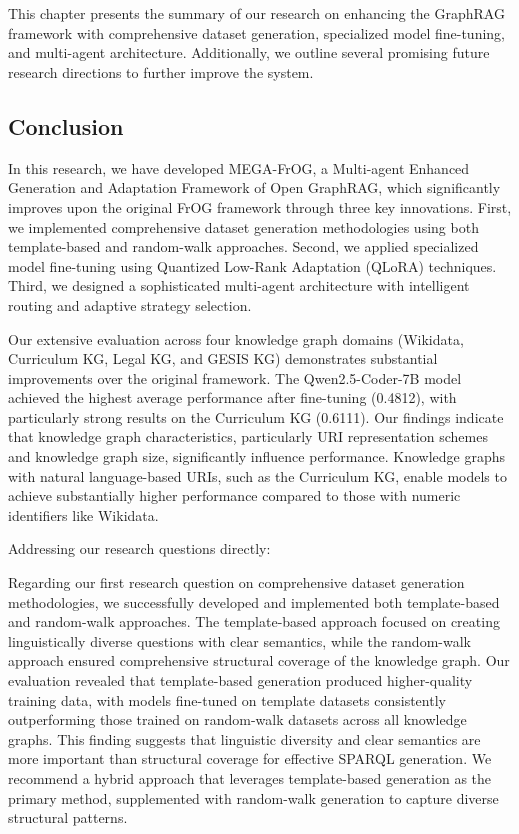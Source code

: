 \chapter{\kesimpulan}
\label{bab:6}
This chapter presents the summary of our research on enhancing the GraphRAG framework with comprehensive dataset generation, specialized model fine-tuning, and multi-agent architecture. Additionally, we outline several promising future research directions to further improve the system.

\section{Conclusion}
In this research, we have developed MEGA-FrOG, a Multi-agent Enhanced Generation and Adaptation Framework of Open GraphRAG, which significantly improves upon the original FrOG framework through three key innovations. First, we implemented comprehensive dataset generation methodologies using both template-based and random-walk approaches. Second, we applied specialized model fine-tuning using Quantized Low-Rank Adaptation (QLoRA) techniques. Third, we designed a sophisticated multi-agent architecture with intelligent routing and adaptive strategy selection.

Our extensive evaluation across four knowledge graph domains (Wikidata, Curriculum KG, Legal KG, and GESIS KG) demonstrates substantial improvements over the original framework. The Qwen2.5-Coder-7B model achieved the highest average performance after fine-tuning (0.4812), with particularly strong results on the Curriculum KG (0.6111). Our findings indicate that knowledge graph characteristics, particularly URI representation schemes and knowledge graph size, significantly influence performance. Knowledge graphs with natural language-based URIs, such as the Curriculum KG, enable models to achieve substantially higher performance compared to those with numeric identifiers like Wikidata.

Addressing our research questions directly:

Regarding our first research question on comprehensive dataset generation methodologies, we successfully developed and implemented both template-based and random-walk approaches. The template-based approach focused on creating linguistically diverse questions with clear semantics, while the random-walk approach ensured comprehensive structural coverage of the knowledge graph. Our evaluation revealed that template-based generation produced higher-quality training data, with models fine-tuned on template datasets consistently outperforming those trained on random-walk datasets across all knowledge graphs. This finding suggests that linguistic diversity and clear semantics are more important than structural coverage for effective SPARQL generation. We recommend a hybrid approach that leverages template-based generation as the primary method, supplemented with random-walk generation to capture diverse structural patterns.

